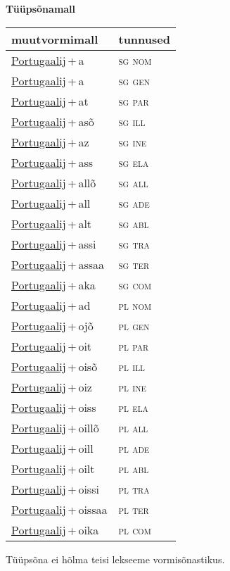 
\vspace{1.8em}
\begin{minipage}{\textwidth}
\textbf{Tüüpsõnamall \,}\\

\begin{sideways}
\begin{tabular}{l l}
muutvormimall & tunnused \\
\hline
\underline{Portugaalij}\,+\,a & \textsc{ sg nom } \\
\underline{Portugaalij}\,+\,a & \textsc{ sg gen } \\
\underline{Portugaalij}\,+\,at & \textsc{ sg par } \\
\underline{Portugaalij}\,+\,asõ & \textsc{ sg ill } \\
\underline{Portugaalij}\,+\,az & \textsc{ sg ine } \\
\underline{Portugaalij}\,+\,ass & \textsc{ sg ela } \\
\underline{Portugaalij}\,+\,allõ & \textsc{ sg all } \\
\underline{Portugaalij}\,+\,all & \textsc{ sg ade } \\
\underline{Portugaalij}\,+\,alt & \textsc{ sg abl } \\
\underline{Portugaalij}\,+\,assi & \textsc{ sg tra } \\
\underline{Portugaalij}\,+\,assaa & \textsc{ sg ter } \\
\underline{Portugaalij}\,+\,aka & \textsc{ sg com } \\
\underline{Portugaalij}\,+\,ad & \textsc{ pl nom } \\
\underline{Portugaalij}\,+\,ojõ & \textsc{ pl gen } \\
\underline{Portugaalij}\,+\,oit & \textsc{ pl par } \\
\underline{Portugaalij}\,+\,oisõ & \textsc{ pl ill } \\
\underline{Portugaalij}\,+\,oiz & \textsc{ pl ine } \\
\underline{Portugaalij}\,+\,oiss & \textsc{ pl ela } \\
\underline{Portugaalij}\,+\,oillõ & \textsc{ pl all } \\
\underline{Portugaalij}\,+\,oill & \textsc{ pl ade } \\
\underline{Portugaalij}\,+\,oilt & \textsc{ pl abl } \\
\underline{Portugaalij}\,+\,oissi & \textsc{ pl tra } \\
\underline{Portugaalij}\,+\,oissaa & \textsc{ pl ter } \\
\underline{Portugaalij}\,+\,oika & \textsc{ pl com } \\
\end{tabular}
\end{sideways}
\label{tab:tüüpsõnamall-portugaalija}

\end{minipage}

 
\vspace{1em}
\noindent Tüüpsõna ei hõlma teisi lekseeme vormi\-sõnastikus.
